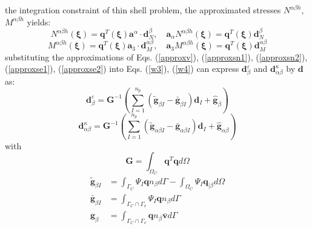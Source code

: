 \DIFdelbegin {}\DIFdelend \DIFaddbegin {}\DIFaddend the integration constraint of thin shell problem, the approximated stresses $N^{\alpha\beta h}$, $M^{\alpha\beta h}$ \DIFdelbegin {}\DIFdelend \DIFaddbegin {}\DIFaddend yields:
\begin{equation}\label{approxse1}
N^{\alpha\beta h}(\boldsymbol \xi) = \boldsymbol q^T(\boldsymbol \xi) \boldsymbol a^\alpha \cdot \boldsymbol d^{\beta}_N,\quad
\boldsymbol a_\alpha N^{\alpha\beta h}(\boldsymbol \xi) = \boldsymbol q^T(\boldsymbol \xi) \boldsymbol d_N^\beta
\end{equation}
\begin{equation}\label{approxse2}
    M^{\alpha\beta h}(\boldsymbol \xi) = \boldsymbol q^T(\boldsymbol \xi) \boldsymbol a_3 \cdot \boldsymbol d^{\alpha\beta}_M,\quad
    \boldsymbol a_3 M^{\alpha\beta h}(\boldsymbol \xi) = \boldsymbol q^T(\boldsymbol \xi) \boldsymbol d^{\alpha\beta}_M
\end{equation}
substituting the approximations of Eqs. (\ref{approxv}), (\ref{approxsn1}), (\ref{approxsn2}), (\ref{approxse1}), (\ref{approxse2}) into Eqs. (\ref{w3}), (\ref{w4}) can express $\boldsymbol d^\varepsilon_\beta$ and $\boldsymbol d^\kappa_{\alpha\beta}$ by $\boldsymbol d$ as:
\begin{equation}\label{depsilon}
\boldsymbol d^\varepsilon_\beta = \boldsymbol G^{-1} \left (\sum_{I=1}^{n_p}(\tilde{\boldsymbol g}_{\beta I} - \bar{\boldsymbol g}_{\beta I}) \boldsymbol d_I + \hat{\boldsymbol g}_\beta \right )
\end{equation}
\begin{equation}\label{dkappa}
\boldsymbol d^\kappa_{\alpha\beta} = \boldsymbol G^{-1} \left (\sum_{I=1}^{n_p}(\tilde{\boldsymbol g}_{\alpha\beta I} - \bar{\boldsymbol g}_{\alpha\beta I})\boldsymbol d_I + \hat{\boldsymbol g}_{\alpha\beta} \right )
\end{equation}
with
\begin{equation}
\boldsymbol G = \int_{\Omega_C} \boldsymbol q^T \boldsymbol q d\Omega
\end{equation}
\begin{subequations}\label{gn}
\begin{align}
\tilde{\boldsymbol g}_{\beta I} &= \int_{\Gamma_C} \Psi_I \boldsymbol q n_\beta d\Gamma
- \int_{\Omega_C} \Psi_I \boldsymbol q_{\vert \beta} d\Omega \\
\bar{\boldsymbol g}_{\beta I} &= \int_{\Gamma_C\cap\Gamma_v} \Psi_I \boldsymbol q n_\beta d\Gamma \\
\hat{\boldsymbol g}_{\beta} &= \int_{\Gamma_C\cap\Gamma_v} \boldsymbol q n_\beta \bar{\boldsymbol v} d\Gamma 
\end{align}
\end{subequations}
